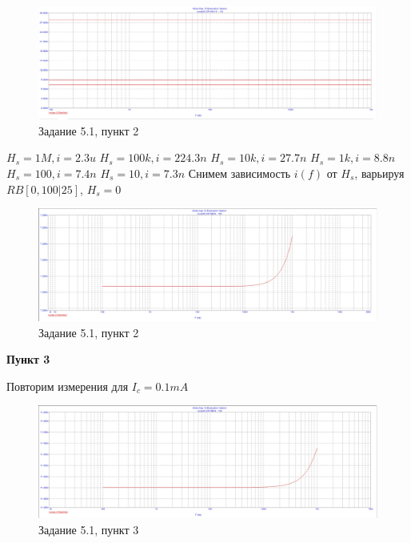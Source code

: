 \documentclass[a4paper, 14pt]{extarticle}%
\begin{document}
\begin{figure}[h!]
			\centering
			\includegraphics[width=1.1\linewidth]{5/5_1_2.jpg}
			\caption{Задание 5.1, пункт 2}
			\label{A}
\end{figure}

$H_s = 1M, i = 2.3u$
\newline
$H_s = 100k, i = 224.3n$
\newline
$H_s = 10k, i = 27.7n$
\newline
$H_s = 1k, i = 8.8n$
\newline
$H_s = 100, i = 7.4n$
\newline
$H_s = 10, i = 7.3n$
\newline
Снимем зависимость $i(f)$ от $H_s$, варьируя $RB[0, 100|25]$, $H_s = 0$

\begin{figure}[h!]
			\centering
			\includegraphics[width=1.1\linewidth]{5/5_1_3.jpg}
			\caption{Задание 5.1, пункт 2}
			\label{A}
\end{figure}

\textbf{Пункт 3}
\newline

Повторим измерения для $I_c = 0.1mA$

\begin{figure}[h!]
			\centering
			\includegraphics[width=1.1\linewidth]{5/5_1_4.jpg}
			\caption{Задание 5.1, пункт 3}
			\label{A}
\end{figure}
\end{document}
